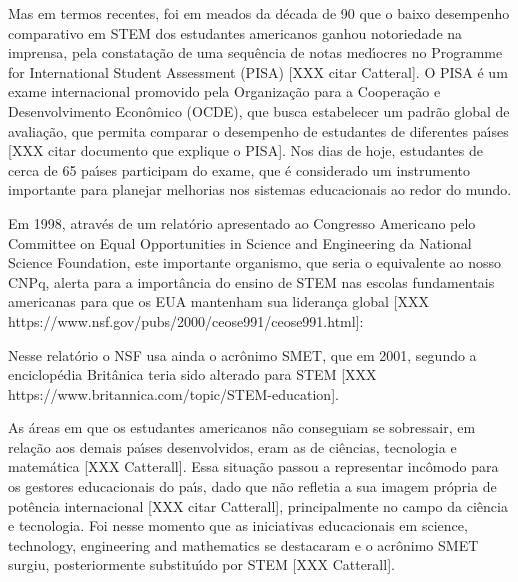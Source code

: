 \documentclass[
12pt,		%
openright,	%
twoside,  %
a4paper,			%
chapter=TITLE,		%
english,			%
french,				%
spanish,			%
brazil				%
]{USPSC-classe/USPSC}
\begin{document}
Mas em termos recentes, foi em meados da d\'ecada de 90 que o baixo desempenho comparativo em STEM dos estudantes americanos ganhou notoriedade na imprensa, pela constata\c{c}\~ao de uma sequ\^encia de notas med\'{\i}ocres no Programme for International Student Assessment (PISA) [XXX citar Catteral]. O PISA \'e um exame internacional promovido pela Organiza\c{c}\~ao para a Coopera\c{c}\~ao e Desenvolvimento Econ\^omico (OCDE), que busca estabelecer um padr\~ao global de avalia\c{c}\~ao, que permita comparar o desempenho de estudantes de diferentes pa\'{\i}ses [XXX citar documento que explique o PISA]. Nos dias de hoje, estudantes de cerca de 65 pa\'{\i}ses participam do exame, que \'e considerado um instrumento importante para planejar melhorias nos sistemas educacionais ao redor do mundo.


Em 1998, atrav\'es de um relat\'orio apresentado ao Congresso Americano pelo Committee on Equal Opportunities in Science and Engineering da National Science Foundation, este importante organismo, que seria o equivalente ao nosso CNPq, alerta para a import\^ancia do ensino de STEM nas escolas fundamentais americanas para que os EUA mantenham sua lideran\c{c}a global [XXX https://www.nsf.gov/pubs/2000/ceose991/ceose991.html]:



\noindent\begin{center}\mbox{\centering{}}\end{center}


Nesse relat\'orio o NSF usa ainda o acr\^onimo SMET, que em 2001, segundo a enciclop\'edia Brit\^anica teria sido alterado para STEM [XXX https://www.britannica.com/topic/STEM-education].


As \'areas em que os estudantes americanos n\~ao conseguiam se sobressair, em rela\c{c}\~ao aos demais pa\'{\i}ses desenvolvidos, eram as de ci\^encias, tecnologia e matem\'atica [XXX Catterall]. Essa situa\c{c}\~ao passou a representar inc\^omodo para os gestores educacionais do pa\'{\i}s, dado que n\~ao refletia a sua imagem pr\'opria de pot\^encia internacional [XXX citar Catterall], principalmente no campo da ci\^encia e tecnologia. Foi nesse momento que as iniciativas educacionais em \textquotedbl science, technology, engineering and mathematics se destacaram e o acr\^onimo SMET surgiu, posteriormente substitu\'{\i}do por STEM [XXX  Catterall].
\end{document}
